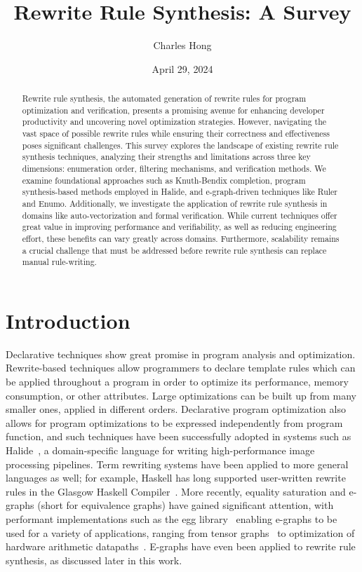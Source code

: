 \documentclass[acmsmall,screen,nonacm]{acmart}
\title{Rewrite Rule Synthesis: A Survey}
\author{Charles Hong}
\affiliation{%
  \institution{UC Berkeley}
  \country{USA}
}
\date{April 29, 2024}
\begin{document}
\begin{abstract}
Rewrite rule synthesis, the automated generation of rewrite rules for program optimization and verification, presents a promising avenue for enhancing developer productivity and uncovering novel optimization strategies. However, navigating the vast space of possible rewrite rules while ensuring their correctness and effectiveness poses significant challenges. This survey explores the landscape of existing rewrite rule synthesis techniques, analyzing their strengths and limitations across three key dimensions: enumeration order, filtering mechanisms, and verification methods. We examine foundational approaches such as Knuth-Bendix completion, program synthesis-based methods employed in Halide, and e-graph-driven techniques like Ruler and Enumo. Additionally, we investigate the application of rewrite rule synthesis in domains like auto-vectorization and formal verification. While current techniques offer great value in improving performance and verifiability, as well as reducing engineering effort, these benefits can vary greatly across domains. Furthermore, scalability remains a crucial challenge that must be addressed before rewrite rule synthesis can replace manual rule-writing.
\end{abstract}

\maketitle

\section{Introduction}
Declarative techniques show great promise in program analysis and optimization. Rewrite-based techniques allow programmers to declare template rules which can be applied throughout a program in order to optimize its performance, memory consumption, or other attributes. Large optimizations can be built up from many smaller ones, applied in different orders. Declarative program optimization also allows for program optimizations to be expressed independently from program function, and such techniques have been successfully adopted in systems such as Halide~\cite{jrk2013halide}, a domain-specific language for writing high-performance image processing pipelines. Term rewriting systems have been applied to more general languages as well; for example, Haskell has long supported user-written rewrite rules in the Glasgow Haskell Compiler~\cite{peytonjones2001playing}. More recently, equality saturation and e-graphs (short for equivalence graphs) have gained significant attention, with performant implementations such as the egg library~\cite{willsey2021egg} enabling e-graphs to be used for a variety of applications, ranging from tensor graphs~\cite{yang2021tensat} to optimization of hardware arithmetic datapaths~\cite{coward2023automating}. E-graphs have even been applied to rewrite rule synthesis, as discussed later in this work. 
\end{document}
